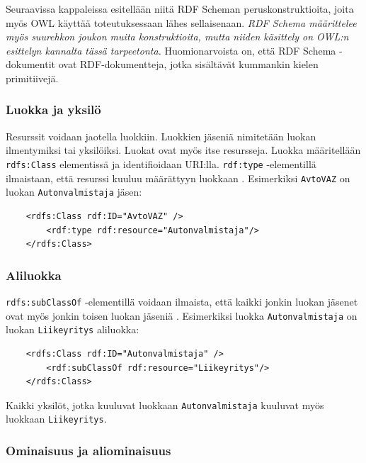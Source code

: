 \documentclass[finnish]{tktltiki2}
\theoremstyle{definition}
\theoremstyle{remark}
\begin{document}
Seuraavissa kappaleissa esitellään niitä RDF Scheman peruskonstruktioita, 
joita myös OWL käyttää toteutuksessaan lähes sellaisenaan. \emph{RDF Schema määrittelee myös suurehkon joukon muita konstruktioita, mutta niiden käsittely on OWL:n esittelyn kannalta tässä tarpeetonta.} 
Huomionarvoista on, että RDF Schema -dokumentit ovat RDF-dokumentteja, jotka sisältävät kummankin kielen primitiivejä. 

\subsubsection{Luokka ja yksilö}
Resurssit voidaan jaotella luokkiin. Luokkien jäseniä nimitetään luokan ilmentymiksi tai yksilöiksi\cite{RDFS}. Luokat ovat myös itse resursseja. Luokka määritellään \texttt{rdfs:Class} elementissä ja identifioidaan URI:lla. \texttt{rdf:type} -elementillä ilmaistaan, että resurssi kuuluu määrättyyn luokkaan \cite{RDFS}. Esimerkiksi \texttt{AvtoVAZ} on luokan \texttt{Autonvalmistaja} jäsen:
\begin{verbatim}
    <rdfs:Class rdf:ID="AvtoVAZ" />
        <rdf:type rdf:resource="Autonvalmistaja"/>
    </rdfs:Class>
\end{verbatim} 

\subsubsection{Aliluokka}
\texttt{rdfs:subClassOf} -elementillä voidaan ilmaista, että kaikki jonkin luokan jäsenet ovat myös jonkin toisen luokan jäseniä \cite{RDFS}. Esimerkiksi 
luokka \texttt{Autonvalmistaja} on luokan \texttt{Liikeyritys} aliluokka:
\begin{verbatim}
    <rdfs:Class rdf:ID="Autonvalmistaja" />
        <rdf:subClassOf rdf:resource="Liikeyritys"/>
    </rdfs:Class>
\end{verbatim}
Kaikki yksilöt, jotka kuuluvat luokkaan \texttt{Autonvalmistaja} kuuluvat myös luokkaan \texttt{Liikeyritys}.

\subsubsection{Ominaisuus ja aliominaisuus}
\end{document}
